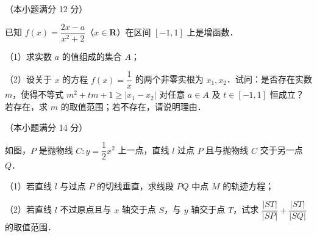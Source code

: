 \begin{question}
（本小题满分 12 分）

已知 $f(x) = \dfrac{2x - a}{x^2 + 2}$（$x \in \mathbf{R}$）在区间 $[-1, 1]$ 上是增函数．

（1）求实数 $a$ 的值组成的集合 $A$；

（2）设关于 $x$ 的方程 $f(x) = \dfrac{1}{x}$ 的两个非零实根为 $x_1, x_2$．试问：是否存在实数 $m$，使得不等式 $m^2 + tm + 1 \geqslant |x_1 - x_2|$ 对任意 $a \in A$ 及 $t \in [-1, 1]$ 恒成立？若存在，求 $m$ 的取值范围；若不存在，请说明理由．

\end{question}
\begin{question}
（本小题满分 14 分）

如图，$P$ 是抛物线 $C: y = \dfrac{1}{2}x^2$ 上一点，直线 $l$ 过点 $P$ 且与抛物线 $C$ 交于另一点 $Q$．

（1）若直线 $l$ 与过点 $P$ 的切线垂直，求线段 $PQ$ 中点 $M$ 的轨迹方程；

（2）若直线 $l$ 不过原点且与 $x$ 轴交于点 $S$，与 $y$ 轴交于点 $T$，试求 $\dfrac{|ST|}{|SP|} + \dfrac{|ST|}{|SQ|}$ 的取值范围．

\end{question}